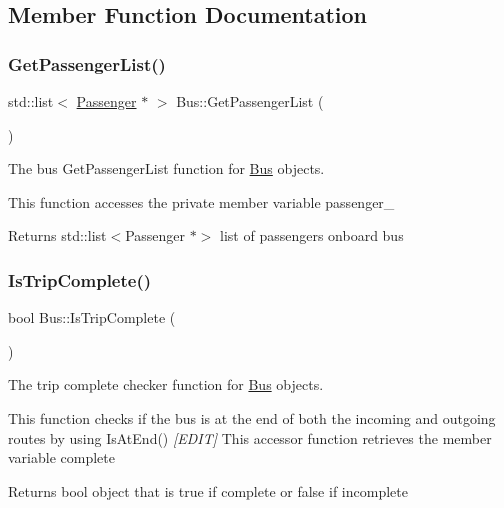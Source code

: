 \subsection{Member Function Documentation}
\mbox{\label{classBus_a0662511d51f1c4ba7466e626be3c2ca0}} 
\subsubsection{\texorpdfstring{Get\+Passenger\+List()}{GetPassengerList()}}
{\footnotesize\ttfamily std\+::list$<$ \hyperlink{classPassenger}{Passenger} $\ast$ $>$ Bus\+::\+Get\+Passenger\+List (\begin{DoxyParamCaption}{ }\end{DoxyParamCaption})}



The bus Get\+Passenger\+List function for \hyperlink{classBus}{Bus} objects. 

This function accesses the private member variable passenger\+\_\+

\begin{DoxyReturn}{Returns}
std\+::list$<$\+Passenger $\ast$$>$ list of passengers onboard bus 
\end{DoxyReturn}
\mbox{\label{classBus_a9c64b0801bf589f121fb0598b70a99b4}} 
\subsubsection{\texorpdfstring{Is\+Trip\+Complete()}{IsTripComplete()}}
{\footnotesize\ttfamily bool Bus\+::\+Is\+Trip\+Complete (\begin{DoxyParamCaption}{ }\end{DoxyParamCaption})}



The trip complete checker function for \hyperlink{classBus}{Bus} objects. 

This function checks if the bus is at the end of both the incoming and outgoing routes by using Is\+At\+End() {\itshape \mbox{[}E\+D\+IT\mbox{]}} This accessor function retrieves the member variable complete

\begin{DoxyReturn}{Returns}
bool object that is true if complete or false if incomplete 
\end{DoxyReturn}
\mbox{\label{classBus_aae72290f9daf683b3068428eee0a9ee7}} 
